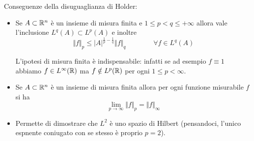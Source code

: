 Conseguenze della disuguaglianza di Holder:
\begin{itemize}
    \item Se $A\subset\mathbb{R}^n$ è un insieme di misura finita e $1\leq p<q\leq+\infty$ allora vale l'inclusione $L^q(A)\subset L^p(A)$ e inoltre
    $$
    \Vert f \Vert_p\leq |A|^{\frac{1}{p}-\frac{1}{q}}\Vert f\Vert_q \qquad \qquad \forall f\in L^q(A) 
    $$
    \begin{rem}
    L'ipotesi di misura finita è indispensabile: infatti se ad esempio $f\equiv 1$ abbiamo $f\in L^\infty(\mathbb{R})$ ma $f\notin L^p(\mathbb{R})$ per ogni $1\leq p<\infty$.
    \end{rem}

    \item Se $A\subset\mathbb{R}^n$ è un insieme di misura finita allora per ogni funzione misurabile $f$ si ha
    $$
    \lim_{p\to\infty}\Vert f\Vert_p=\Vert f\Vert_{\infty}
    $$

    \item Permette di dimostrare che $L^2$ è uno spazio di Hilbert (pensandoci, l'unico espnente coniugato con se stesso è proprio $p=2$).
\end{itemize}


